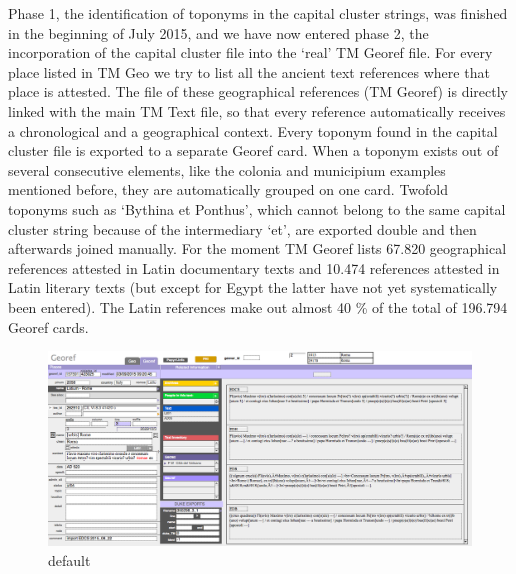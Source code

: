 \documentclass[amsthm,ebook]{saparticle}
\begin{document}
Phase 1, the identification of toponyms in the capital cluster strings, was finished in the beginning of July 2015,
and we have now entered phase 2, the incorporation of the capital cluster file into the `real' TM Georef file. For
every place listed in TM Geo we try to list all the ancient text references where that place is attested. The file of
these geographical references (TM Georef) is directly linked with the main TM Text file, so that every reference
automatically receives a chronological and a geographical context. Every toponym found in the capital cluster file is
exported to a separate Georef card. When a toponym exists out of several consecutive elements, like the colonia and
municipium examples mentioned before, they are automatically grouped on one card. Twofold toponyms such as `Bythina et
Ponthus', which cannot belong to the same capital cluster string because of the intermediary `et', are exported double
and then afterwards joined manually. For the moment TM Georef lists 67.820 geographical references attested in Latin
documentary texts and 10.474 references attested in Latin literary texts (but except for Egypt the latter have not yet
systematically been entered). The Latin references make out almost 40 \% of the total of 196.794 Georef cards.




\begin{figure}[!bp]
\centering
 \includegraphics[width=\columnwidth]{EAGLE2016FullPaperVerreth-img002.png}
\caption{default}
\label{fig:2}
\end{figure}
\end{document}
